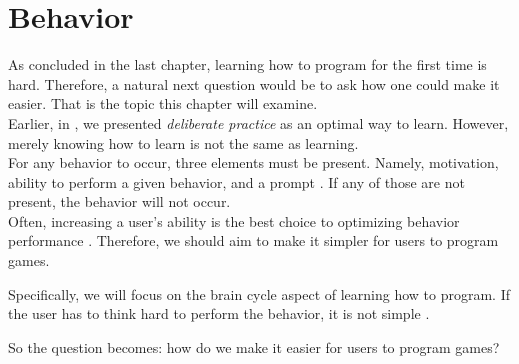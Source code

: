 \chapter{Behavior}\label{chap:behavior}

As concluded in the last chapter, learning how to program for the first time is hard.
Therefore, a natural next question would be to ask how one could make it easier.
That is the topic this chapter will examine. \\

Earlier, in , we presented \textit{deliberate practice} as an optimal way to learn.
However, merely knowing how to learn is not the same as learning. \\

For any behavior to occur, three elements must be present. Namely, motivation, ability to perform a given behavior, and a prompt \cite{bjfoggBehaviorModelPersuasive2009}. If any of those are not present, the behavior will not occur. \\

Often, increasing a user's ability is the best choice to optimizing behavior performance \cite{bjfoggBehaviorModelPersuasive2009}. Therefore, we should aim to make it simpler for users to program games.

Specifically, we will focus on the brain cycle aspect of learning how to program. If the user has to think hard to perform the behavior, it is not simple \cite{bjfoggBehaviorModelPersuasive2009}.

So the question becomes: how do we make it easier for users to program games?

